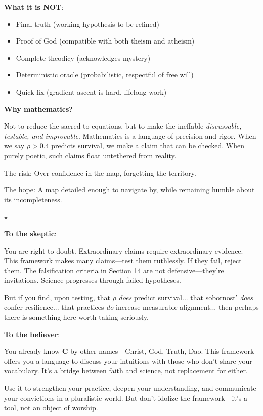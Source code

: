 \documentclass[11pt,a4paper]{article}
\theoremstyle{definition}
\theoremstyle{remark}
\begin{document}
\begin{enumerate}
\begin{protocol}
\textbf{What it is NOT}:
\begin{itemize}
    \item Final truth (working hypothesis to be refined)
    \item Proof of God (compatible with both theism and atheism)
    \item Complete theodicy (acknowledges mystery)
    \item Deterministic oracle (probabilistic, respectful of free will)
    \item Quick fix (gradient ascent is hard, lifelong work)
\end{itemize}

\textbf{Why mathematics?}

Not to reduce the sacred to equations, but to make the ineffable \textit{discussable, testable, and improvable}. Mathematics is a language of precision and rigor. When we say \(\rho > 0.4\) predicts survival, we make a claim that can be checked. When purely poetic, such claims float untethered from reality.

The risk: Over-confidence in the map, forgetting the territory. 

The hope: A map detailed enough to navigate by, while remaining humble about its incompleteness.

\begin{center}
\(\star\)
\end{center}

\textbf{To the skeptic}:

You are right to doubt. Extraordinary claims require extraordinary evidence. This framework makes many claims—test them ruthlessly. If they fail, reject them. The falsification criteria in Section 14 are not defensive—they're invitations. Science progresses through failed hypotheses.

But if you find, upon testing, that \(\rho\) \textit{does} predict survival... that sobornost' \textit{does} confer resilience... that practices \textit{do} increase measurable alignment... then perhaps there is something here worth taking seriously.

\textbf{To the believer}:

You already know \(\mathbf{C}\) by other names—Christ, God, Truth, Dao. This framework offers you a language to discuss your intuitions with those who don't share your vocabulary. It's a bridge between faith and science, not replacement for either.

Use it to strengthen your practice, deepen your understanding, and communicate your convictions in a pluralistic world. But don't idolize the framework—it's a tool, not an object of worship.


\end{protocol}
\end{enumerate}
\end{document}
